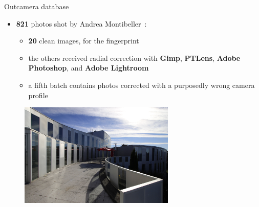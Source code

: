 \begin{frame}{Outcamera database}

    \begin{itemize}
        \item<1-> \textbf{821} photos shot by Andrea Montibeller~\cite{montibeller}: \begin{itemize}
            \item<2-> \textbf{20} clean images, for the fingerprint
            \item<3-> the others received radial correction with \textbf{Gimp}, \textbf{PTLens}, \textbf{Adobe Photoshop}, and \textbf{Adobe Lightroom}
            \item<4-> a fifth batch contains photos corrected with a purposedly wrong camera profile
        \end{itemize}
    \end{itemize}
    
    \begin{figure}
        \centering
        \includegraphics[width=0.66\textwidth]{../drawable/examples/example-outcamera-im24.jpg}
    \end{figure}
    
\end{frame}

